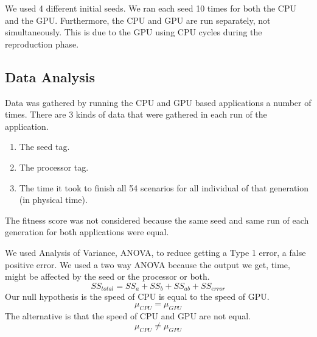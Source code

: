 We used 4 different initial seeds. We ran each seed 10 times for both the CPU and 
the GPU. Furthermore, the CPU and GPU are run separately, not simultaneously. This
is due to the GPU using CPU cycles during the reproduction phase.

\subsection{Data Analysis}
Data was gathered by running the CPU and GPU based applications a number of
times. There are 3 kinds of data that were gathered in each run of the application.
\begin{enumerate}
  \item The seed tag.
  \item The processor tag.
  \item The time it took to finish all 54 scenarios for all individual of 
that generation (in physical time).
\end{enumerate}
The fitness score was not considered because the same seed and same run of each 
generation for both applications were equal.


We used Analysis of Variance, ANOVA, to reduce getting a Type 1 error, a false
positive error. We used a two way ANOVA because the output we get, time, might
be affected by the seed or the processor or both.
$$
SS_{total} = SS_a + SS_b + SS_{ab} + SS_{error}
$$
Our null hypothesis is the speed of CPU is equal to the speed of GPU.
$$
\mu_{CPU} = \mu_{GPU}
$$
The alternative is that the speed of CPU and GPU are not equal.
$$
\mu_{CPU} \neq \mu_{GPU}
$$

